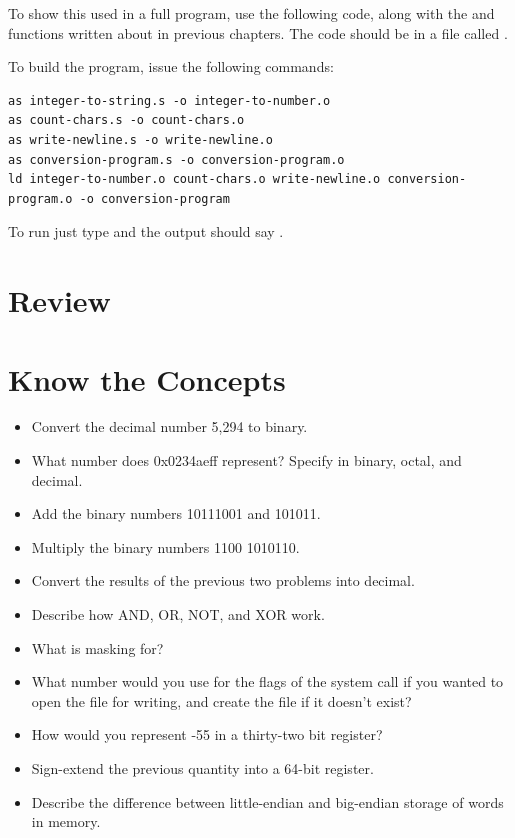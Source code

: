 \begin{simpletyping}

\end{simpletyping}

To show this used in a full program, use the following code, along
with the  and 
functions written about in previous chapters.  The code should be
in a file called .

\begin{simpletyping}

\end{simpletyping}

To build the program, issue the following commands:

\begin{simpletyping}
\begin{lstlisting}
as integer-to-string.s -o integer-to-number.o
as count-chars.s -o count-chars.o
as write-newline.s -o write-newline.o
as conversion-program.s -o conversion-program.o
ld integer-to-number.o count-chars.o write-newline.o conversion-program.o -o conversion-program
\end{lstlisting}
\end{simpletyping}

To run just type  and the output
should say .

\section{Review}

\section{Know the Concepts}

\begin{itemize}\item Convert the decimal number 5,294 to binary. 
\item What number does 0x0234aeff represent?  Specify in binary, octal, and decimal. 
\item Add the binary numbers 10111001 and 101011. 
\item Multiply the binary numbers 1100 1010110. 
\item Convert the results of the previous two problems into decimal. 
\item Describe how AND, OR, NOT, and XOR work. 
\item What is masking for? 
\item What number would you use for the flags of the  system call if you wanted to open the file for writing, and create the file if it doesn't exist? 
\item How would you represent -55 in a thirty-two bit register? 
\item Sign-extend the previous quantity into a 64-bit register. 
\item Describe the difference between little-endian and big-endian storage of words in memory. 
\end{itemize}

